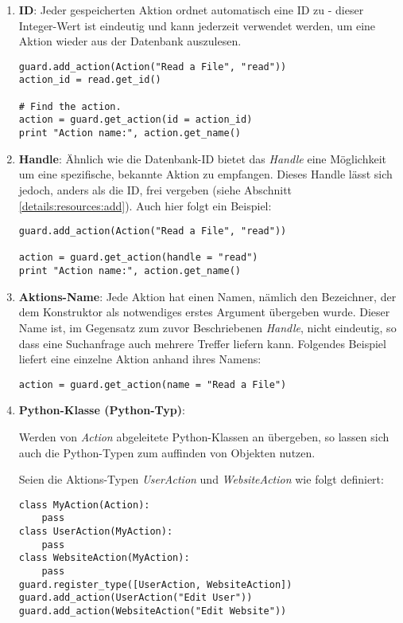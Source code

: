 \begin{enumerate}
\item {\bf ID}: Jeder gespeicherten Aktion ordnet \product automatisch
eine ID zu - dieser Integer-Wert ist eindeutig und kann jederzeit verwendet 
werden, um eine Aktion wieder aus der Datenbank auszulesen.

\begin{lstlisting}
guard.add_action(Action("Read a File", "read"))
action_id = read.get_id()

# Find the action.
action = guard.get_action(id = action_id)
print "Action name:", action.get_name()
\end{lstlisting}

\item {\bf Handle}: Ähnlich wie die Datenbank-ID bietet das {\it Handle} 
eine Möglichkeit um eine spezifische, bekannte Aktion zu empfangen. Dieses 
Handle lässt sich jedoch, anders als die ID, frei vergeben (siehe 
Abschnitt \ref{details:resources:add}). Auch hier folgt ein Beispiel:

\begin{lstlisting}
guard.add_action(Action("Read a File", "read"))

action = guard.get_action(handle = "read")
print "Action name:", action.get_name()
\end{lstlisting}

\item {\bf Aktions-Name}: Jede Aktion hat einen Namen, nämlich den 
Bezeichner, der dem Konstruktor als notwendiges erstes Argument 
übergeben wurde.
Dieser Name ist, im Gegensatz zum zuvor Beschriebenen {\it Handle}, nicht 
eindeutig, so dass eine Suchanfrage auch mehrere Treffer liefern kann.
Folgendes Beispiel liefert eine einzelne Aktion anhand ihres Namens:

\begin{lstlisting}
action = guard.get_action(name = "Read a File")
\end{lstlisting}

\item {\bf Python-Klasse (Python-Typ)}: 

Werden von {\it Action} abgeleitete Python-Klassen an \product übergeben, 
so lassen sich auch die Python-Typen zum auffinden von Objekten nutzen.

Seien die Aktions-Typen {\it UserAction} und {\it WebsiteAction} wie 
folgt definiert:

\begin{lstlisting}
class MyAction(Action):
    pass
class UserAction(MyAction):
    pass
class WebsiteAction(MyAction):
    pass
guard.register_type([UserAction, WebsiteAction])
guard.add_action(UserAction("Edit User"))
guard.add_action(WebsiteAction("Edit Website"))
\end{lstlisting}


\end{enumerate}
